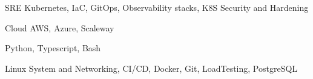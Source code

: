 

\begin{cvskills}

  \cvskill
    {SRE} %
    {Kubernetes, IaC, GitOps, Observability stacks, K8S Security and Hardening} %

  \cvskill
    {Cloud}
    {AWS, Azure, Scaleway}

  \cvskill
    {} %
    {Python, Typescript, Bash } %

  \cvskill
    {} %
    {Linux System and Networking, CI/CD, Docker, Git, LoadTesting, PostgreSQL } %

  \cvskill
    {} %
    {} %

\end{cvskills}
